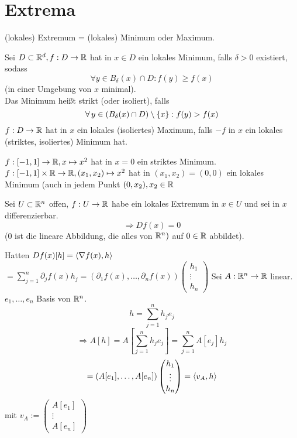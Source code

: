 \documentclass[../ana2.tex]{subfiles}
\begin{document}
\setcounter{section}{13}
\section{Extrema}
(lokales) Extremum = (lokales) Minimum oder Maximum.
\begin{defi}
    Sei \(D \subset \mathbb{R}^d, f:D\rightarrow \mathbb{R}\) hat in \(x \in D\)
    ein lokales Minimum, falls \(\delta > 0\) existiert, sodass
    \[ \forall y \in B_\delta(x) \cap D: f(y) \geq f(x) \]
    (in einer Umgebung von \(x\) minimal). \\
    Das Minimum heißt strikt (oder isoliert), falls 
    \[ \forall y \in (B_\delta(x) \cap D) \setminus \set{x}: f(y) > f(x) \]
    \( f:D\rightarrow \mathbb{R} \) hat in \(x\) ein lokales (isoliertes) Maximum,
    falls \(-f\) in \(x\) ein lokales (striktes, isoliertes) Minimum hat.
\end{defi}
\begin{bsp}
    \(f:[-1, 1]\rightarrow \mathbb{R}, x \mapsto x^2\) hat in \(x = 0\) ein striktes Minimum.\\
    \( f:[-1,1]\times \mathbb{R}\rightarrow \mathbb{R}, (x_1, x_2) \mapsto x^2 \) hat in 
    \((x_1, x_2) = (0,0)\) ein lokales Minimum (auch in jedem Punkt 
    \((0, x_2), x_2 \in \mathbb{R} \)
\end{bsp}
\begin{satz}
    Sei \(U\subset \mathbb{R}^n\) offen, \(f:U\rightarrow \mathbb{R}\) habe ein lokales Extremum
    in \(x \in U\) und sei in \(x\) differenzierbar.
    \[ \Rightarrow Df(x) = 0 \]
    (\(0\) ist die lineare Abbildung, die alles von \(\mathbb{R}^n)\) auf \(0 \in \mathbb{R}\)
    abbildet).
\end{satz}
Hatten \(Df(x)[h] = \langle \nabla f(x), h \rangle \)\\
\( = \sum_{j=1}^n \partial_j f(x) h_j = (\partial_1 f(x), \ldots, \partial_n f(x)) \begin{pmatrix}
    h_1\\
    \vdots\\
    h_n
\end{pmatrix} \)
Sei \(A:\mathbb{R}^n\rightarrow \mathbb{R}\) linear. \(e_1, \ldots, e_n\) Basis von \(\mathbb{R}^n\).
\[ h = \sum_{j = 1}^{n} h_j e_j \]
\[ \Rightarrow A[h] = A[\sum_{j = 1}^{n} h_j e_j ] = \sum_{j=1}^n A[e_j]h_j \]
\[ = (A[e_1], \ldots, A[e_n]) \begin{pmatrix}
    h_1\\
    \vdots\\
    h_n
\end{pmatrix} = \langle v_A, h \rangle \]
mit \(v_A := \begin{pmatrix}
    A[e_1]\\
    \vdots\\
    A[e_n]
\end{pmatrix}\)
\end{document}

